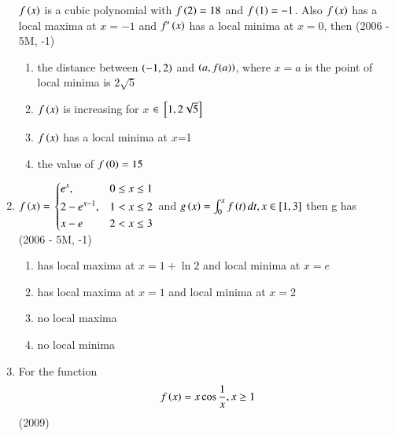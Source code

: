\documentclass[journal]{IEEEtran}
\begin{document}
\begin{enumerate}
{            $f\left(x\right)$ is a cubic polynomial with  $f\left(2\right)=18$ and $f\left(1\right)=-1$. Also $f\left(x\right)$ has a local maxima at $x=-1$ and $f^{\prime}\left(x\right)$ has a local minima at $x=0$, then
              \hfill
                {(2006 - 5M, -1)}
            
            \begin{enumerate}
                \item the distance between $\left(-1,2\right)$ and $\left(a,f(a)\right)$, where $x=a$ is the point of local minima is $2\sqrt{5}$
                \item $f\left(x\right)$ is increasing for $x$ $\in {}\left[1,2\sqrt{5}\right]$
                \item $f\left(x\right)$ has a local minima at $x$=1
                \item the value of $f\left(0\right)=15$
            \end{enumerate}
        
        }
    \item{
        
            $f\left(x\right) = $    
            $\begin{dcases}%
                e^x, & 0 \leq x\leq 1 \\
                2-e^{x-1}, & 1 < x\leq 2 \\
                x-e & 2 < x\leq 3 \\
            \end{dcases}$ and $g\left(x\right) = \int_0^{x}f\left(t\right)dt, x \in[1,3]$ then g has
             \\ \text{   } \hfill
                {(2006 - 5M, -1)}
            
            \begin{enumerate}
                \item has local maxima at $x = 1+ \ln{2}$ and local minima at $x = e$
                \item has local maxima at $x = 1$ and local minima at $x = 2$
                \item no local maxima
                \item no local minima
            \end{enumerate}
        
        }
    \item{
        
            For the function $$f\left(x\right) = x\cos{\frac{1}{x}}, x\geq1$$
             \hfill
                {(2009)}
            
}
\end{enumerate}
\end{document}
